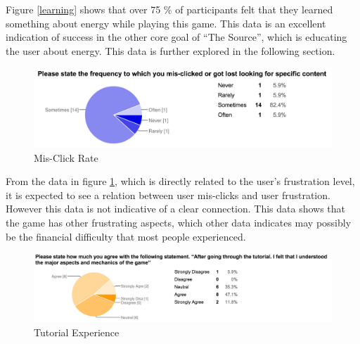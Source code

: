 \documentclass[msc,oneside]{ubcthesis}%
\begin{document}
Figure \ref{learning} shows that over 75 \% of participants felt that they learned something about energy while playing this game. This data is an excellent indication of success in the other core goal of ``The Source'', which is educating the user about energy. This data is further explored in the following section.

\newpage
\begin{figure}[hbt]
  \begin{center}
    \includegraphics[width=1\textwidth]{survey_pics/numeric/mis_clicked}
    \caption[Mis-Click Rate ]{Mis-Click Rate}\label{mis-click}
  \end{center}
\end{figure}


From the data in figure \ref{mis-click}, which is directly related to the user's frustration level, it is expected to see a relation between user mis-clicks and user frustration. However this data is not indicative of a clear connection. This data shows that the game has other frustrating aspects, which other data indicates may possibly be the financial difficulty that most people experienced.

\begin{figure}[hbt]
  \begin{center}
    \includegraphics[width=1\textwidth]{survey_pics/numeric/tutorial}
    \caption[Tutorial Experience]{Tutorial Experience}\label{tutorial}
  \end{center}
\end{figure}
\end{document}
